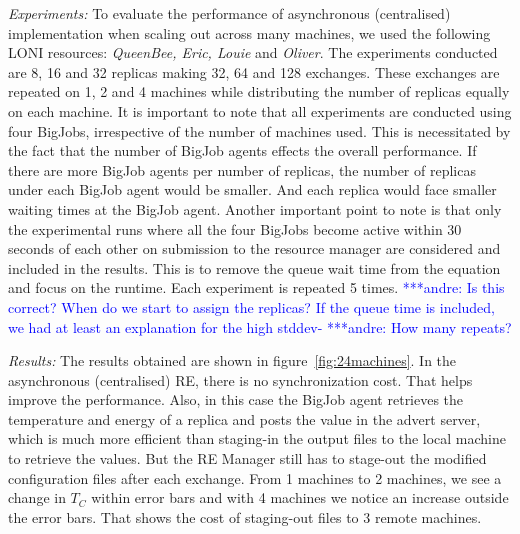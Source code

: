 \documentclass{rspublic}
\newcommand{\alnote}[1]{ {\textcolor{blue} { ***andre: #1 }}}
\newcommand{\alnote}[1]{}
\begin{document}
{\it Experiments:} To evaluate the performance of asynchronous (centralised) implementation when scaling out across many machines, we used the following LONI resources: \emph{QueenBee, Eric, Louie} and \emph{Oliver}. The experiments conducted are 8, 16 and 32 replicas making 32, 64 and 128 exchanges. These exchanges are repeated on 1, 2 and 4 machines while distributing the number of replicas equally on each machine. It is important to note that all experiments are conducted using four BigJobs, irrespective of the number of machines used. This is necessitated by the fact that the number of BigJob agents effects the overall performance. If there are more BigJob agents per number of replicas, the number of replicas under each BigJob agent would be smaller. And each replica would face smaller waiting times at the BigJob agent. Another important point to note is that only the experimental runs where all the four BigJobs become active within 30 seconds of each other on submission to the resource manager are considered and included in the results. This is to remove the queue wait time from the equation and focus on the runtime. Each experiment is repeated 5 times. 
 \alnote{Is this correct? When do we start to assign the replicas? If the 
queue time is included, we had at least an explanation for the high stddev-}
\alnote{How many repeats?} 

{\it Results:} The results obtained are shown in figure~\ref{fig:24machines}. 
In the asynchronous (centralised) RE, there is no synchronization cost. That helps improve the performance. Also, in this case the BigJob agent retrieves the temperature and energy of a replica and posts the value in the advert server, which is much more efficient than staging-in the output files to the local machine to retrieve the values. But the RE Manager still has to stage-out the modified configuration files after each exchange. From 1 machines to 2 machines, we see a change in $T_C$ within error bars and with 4 machines we notice an increase outside the error bars. That shows the cost of staging-out files to 3 remote machines.
\end{document}
